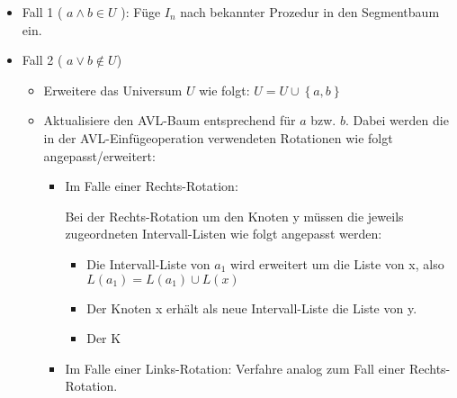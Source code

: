 \documentclass[a4paper]{article}
\begin{document}
\begin{itemize}
 \item Fall 1 ( $a \wedge b \in U$ ): 
    Füge $I_n$ nach bekannter Prozedur in den Segmentbaum ein.
 \item Fall 2 ( $a \vee b  \notin U$)
    \begin{itemize}
     \item Erweitere das Universum $U$ wie folgt: $U = U \cup \left\{a,b\right\}$
     \item Aktualisiere den AVL-Baum entsprechend für $a$ bzw. $b$. Dabei werden die in der 
     AVL-Einfügeoperation verwendeten Rotationen wie folgt angepasst/erweitert:
     \begin{itemize}
      \item Im Falle einer Rechts-Rotation:
      
   
      
      Bei der Rechts-Rotation um den Knoten y müssen die jeweils zugeordneten Intervall-Listen
      wie folgt angepasst werden:
    
      \begin{itemize}
       \item Die Intervall-Liste von $a_1$ wird erweitert um die Liste von x, also $L(a_1) = L(a_1) \cup L(x)$
       \item Der Knoten x erhält als neue Intervall-Liste die Liste von y.
       \item Der K
      \end{itemize}

      
      \item Im Falle einer Links-Rotation: Verfahre analog zum Fall einer Rechts-Rotation.
     \end{itemize}

    \end{itemize}

\end{itemize}
\end{document}
